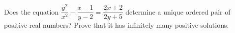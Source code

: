 Does the equation $\dfrac{y^2}{x^2}-\dfrac{x-1}{y-2}=\dfrac{2x+2}{2y+5}$ determine a unique ordered pair of positive real numbers? Prove that it has infinitely many positive solutions.
